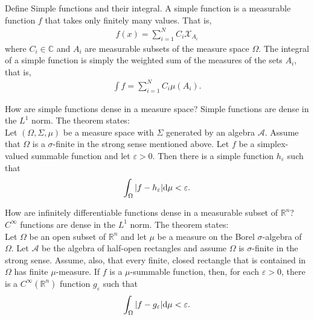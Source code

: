 \documentclass[avery5388,grid,frame]{flashcards}
\newcommand{\E}{\varepsilon}
\def\Rl{\mathbb{R}}
\def\Cx{\mathbb{C}}
\begin{document}
\begin{flashcard}
    {Define Simple functions and their integral.}
    A simple function is a measurable function $f$ that takes only finitely many values.  That is,
    \begin{align*}
        f(x) = \sum_{i=1}^NC_i\mathcal{X}_{A_i}
    \end{align*}
    where $C_i \in \Cx$ and $A_i$ are measurable subsets of the measure space $\Omega$.  The integral of a simple function is simply the weighted sum of the measures of the sets $A_i$, that is,
    \begin{align*}
        \int f = \sum_{i=1}^N C_i\mu(A_i).
    \end{align*}
\end{flashcard}

\begin{flashcard}
    {How are simple functions dense in a measure space?}
    Simple functions are dense in the $L^1$ norm.  The theorem states: \\

    Let $(\Omega,\Sigma,\mu)$ be a measure space with $\Sigma$ generated by an algebra $\mathcal{A}$.  Assume that $\Omega$ is a $\sigma$-finite in the strong sense mentioned above.  Let $f$ be a simplex-valued summable function and let $\E > 0$.  Then there is a simple function $h_\E$ such that
    \begin{align*}
        \int_\Omega \abs{f - h_\E}\dd\mu < \E.
    \end{align*}
\end{flashcard}

\begin{flashcard}
    {How are infinitely differentiable functions dense in a measurable subset of $\Rl^n$?}
    $C^\infty$ functions are dense in the $L^1$ norm.  The theorem states: \\

    Let $\Omega$ be an open subset of $\Rl^n$ and let $\mu$ be a measure on the Borel $\sigma$-algebra of $\Omega$.  Let $\mathcal{A}$ be the algebra of half-open rectangles and assume $\Omega$ is $\sigma$-finite in the strong sense.  Assume, also, that every finite, closed rectangle that is contained in $\Omega$ has finite $\mu$-measure.  If $f$ is a $\mu$-summable function, then, for each $\E > 0$, there is a $C^\infty(\Rl^n)$ function $g_\E$ such that
    \begin{align*}
        \int_\Omega \abs{f - g_\E}\dd\mu < \E.
    \end{align*}
\end{flashcard}
\end{document}
